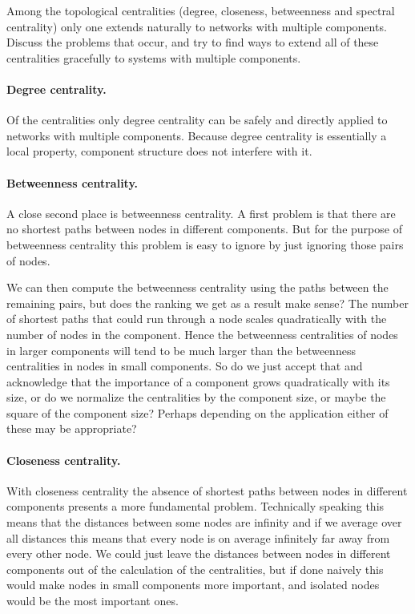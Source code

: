 Among the topological centralities (degree, closeness, betweenness and spectral centrality) only one extends naturally to networks with multiple components. Discuss the problems that occur, and try to find ways to extend all of these centralities gracefully to systems with multiple components.

\solution
\paragraph{Degree centrality.}Of the centralities only degree centrality can be safely and directly applied to networks with multiple components. Because degree centrality is essentially a local property, component structure does not interfere with it. 

\paragraph{Betweenness centrality.}A close second place is betweenness centrality. 
A first problem is that there are no shortest paths between nodes in different components. But for the purpose of betweenness centrality this problem is easy to ignore by just ignoring those pairs of nodes. 

We can then compute the betweenness centrality using the paths between the remaining pairs, but does the ranking we get as a result make sense? The number of shortest paths that could run through a node scales quadratically with the number of nodes in the component. Hence the betweenness centralities of nodes in larger components will tend to be much larger than the betweenness centralities in nodes in small components. So do we just accept that and acknowledge that the importance of a component grows quadratically with its size, or do we normalize the centralities by the component size, or maybe the square of the component size? Perhaps depending on the application either of these may be appropriate?

\paragraph{Closeness centrality.}With closeness centrality the absence of shortest paths between nodes in different components presents a more fundamental problem. Technically speaking this means that the distances between some nodes are infinity and if we average over all distances this means that every node is on average infinitely far away from every other node. We could just leave the distances between nodes in different components out of the calculation of the centralities, but if done naively this would make nodes in small components more important, and isolated nodes would be the most important ones. 

